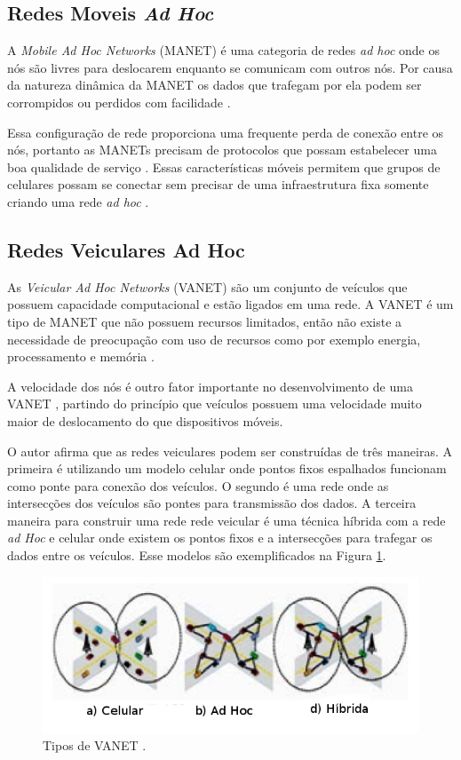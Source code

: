  \subsection{Redes Moveis \emph{Ad Hoc}}
A \emph{Mobile Ad Hoc Networks} (MANET) é uma categoria de redes \emph{ad hoc} \cite{Rezende:2008} onde os nós são livres para deslocarem enquanto se comunicam com outros nós. Por causa da natureza dinâmica da MANET os dados que trafegam por ela podem ser corrompidos ou perdidos com facilidade \cite{Bai:2003}.

Essa configuração de rede proporciona uma frequente perda de conexão entre os nós, portanto as MANETs precisam de protocolos que possam estabelecer uma boa qualidade de serviço \cite{Bai:2003}. Essas características móveis permitem que grupos de celulares possam se conectar sem precisar de uma infraestrutura fixa somente criando uma rede \emph{ad hoc} \cite{Piorkowski:2009}.

 \subsection{Redes Veiculares Ad Hoc}



As \emph{Veicular Ad Hoc Networks} (VANET) são um conjunto de veículos que possuem capacidade computacional e estão ligados em uma rede. A VANET é um tipo de MANET que não possuem recursos limitados, então não existe a necessidade de preocupação com uso de recursos como por exemplo energia, processamento e memória \cite{Loulloudes:2010}.

A velocidade dos nós é outro fator importante no desenvolvimento de uma VANET \cite{Kumar:2011}, partindo do princípio que veículos possuem uma velocidade muito maior de deslocamento do que dispositivos móveis. 

O autor \cite{Kumar:2011} afirma que as redes veiculares podem ser construídas de três maneiras. A primeira é utilizando um modelo celular onde pontos fixos espalhados funcionam como ponte para conexão dos veículos. O segundo é uma rede onde as intersecções dos veículos são pontes para transmissão dos dados. A terceira maneira para construir uma rede rede veicular é uma técnica híbrida com a rede \emph{ad Hoc} e celular onde existem os pontos fixos e a intersecções para trafegar os dados entre os veículos. Esse modelos são exemplificados na Figura \ref{fig:fig28}.

\begin{figure}[htbp]
	\centering
		\includegraphics[scale=0.4]{referencial/figuras/Figure28.png}
	\caption{Tipos de VANET \cite{Kumar:2011}.}
	\label{fig:fig28}
\end{figure}

